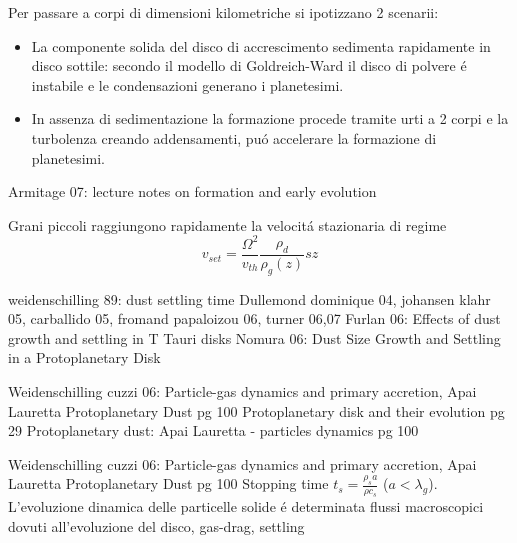 Per passare a corpi di dimensioni kilometriche si ipotizzano 2 scenarii:
\begin{itemize}
\item La componente solida del disco di accrescimento sedimenta rapidamente in disco sottile: secondo il modello di Goldreich-Ward il disco di polvere \'e instabile e le condensazioni generano i planetesimi.
\item In assenza di sedimentazione la formazione procede tramite urti a 2 corpi e la turbolenza creando addensamenti, pu\'o accelerare la formazione di planetesimi.
\end{itemize}

\begin{workout}
Armitage 07: lecture notes on formation and early evolution
 \end{workout}

\begin{workout}	
Grani piccoli raggiungono rapidamente la velocit\'a stazionaria di regime
\begin{equation}
v_{set}=\frac{\Omega^2}{v_{th}}\frac{\rho_d}{\rho_g(z)}sz
\end{equation}
 \end{workout}
 
\begin{workout}
weidenschilling 89: dust settling time
Dullemond dominique 04, johansen klahr 05, carballido 05, fromand papaloizou 06, turner 06,07
Furlan 06: Effects of dust growth and settling in T Tauri disks
Nomura 06: Dust Size Growth and Settling in a Protoplanetary Disk
\cite{lissauer1993planet}
 \end{workout}

\begin{workout}
Weidenschilling cuzzi 06: Particle-gas dynamics and primary accretion, Apai Lauretta Protoplanetary Dust pg 100
Protoplanetary disk and their evolution pg 29
Protoplanetary dust: Apai Lauretta - particles dynamics pg 100
\end{workout}

\begin{workout}
Weidenschilling cuzzi 06: Particle-gas dynamics and primary accretion, Apai Lauretta Protoplanetary Dust pg 100
Stopping time $t_s=\frac{\rho_sa}{\rho c_s}$ ($a<\lambda_g$). L'evoluzione dinamica delle particelle solide \'e determinata flussi macroscopici dovuti all'evoluzione del disco, gas-drag, settling
\end{workout}

